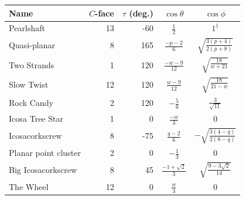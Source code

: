\begin{center}
\small
\renewcommand{\arraystretch}{1.55}
\begin{tabular}{@{}lrrcc@{}}
\toprule
Name & $C$-face & $\tau$ (deg.) & $\cos\theta$ & $\cos\phi$\\
\midrule
Pearlshaft & 13 & -60 & $\displaystyle \frac{1}{2}$ & $\displaystyle 1^{\dagger}$\\
Quasi-planar & 8 & 165 & $\displaystyle \frac{- p - 2}{6}$ & $\displaystyle \sqrt{\frac{3 \left(p + 4\right)}{2 \left(p + 8\right)}}$\\
Two Strands & 1 & 120 & $\displaystyle \frac{- w - 9}{12}$ & $\displaystyle \sqrt{\frac{18}{w + 21}}$\\
Slow Twist & 12 & 120 & $\displaystyle \frac{w - 9}{12}$ & $\displaystyle \sqrt{\frac{18}{21 - w}}$\\
Rock Candy & 2 & 120 & $\displaystyle - \frac{5}{6}$ & $\displaystyle \frac{3}{\sqrt{11}}$\\
Icosa Tree Star & 1 & 0 & $\displaystyle \frac{- w}{3}$ & $\displaystyle 0$\\
Icosacorkscrew & 8 & -75 & $\displaystyle \frac{q - 2}{6}$ & $\displaystyle - \sqrt{\frac{3 \left(4 - q\right)}{2 \left(8 - q\right)}}$\\
Planar point cluster & 2 & 0 & $\displaystyle - \frac{1}{3}$ & $\displaystyle 0$\\
Big Icosacorkscrew & 8 & 45 & $\displaystyle \frac{-1 + \sqrt{2}}{3}$ & $\displaystyle \sqrt{\frac{9 - 3 \sqrt{2}}{14}}$\\
The Wheel & 12 & 0 & $\displaystyle \frac{w}{3}$ & $\displaystyle 0$\\
\bottomrule
\end{tabular}
\end{center}
